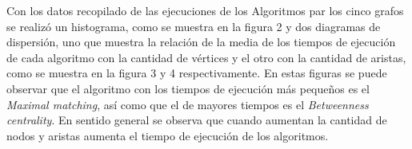 \documentclass{article}
\begin{document}
Con los datos recopilado de las ejecuciones de los Algoritmos par los cinco grafos se realizó un histograma, como se muestra en la figura 2 y dos diagramas de dispersión, uno que muestra la relación de la media de los tiempos de ejecución de cada algoritmo con la cantidad de vértices y el otro con la cantidad de aristas, como se muestra en la figura 3 y 4 respectivamente. En estas figuras se puede observar que el algoritmo con los tiempos de ejecución más pequeños es el \textit{Maximal matching}, así como que el de mayores tiempos es el \textit{Betweenness centrality}. En sentido general se observa que cuando aumentan la cantidad de nodos y aristas aumenta el tiempo de ejecución de los algoritmos.



  
\begin{center}

\end{center}

\newpage
\begin{center}

\end{center}
\end{document}
